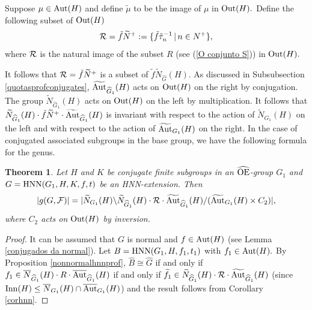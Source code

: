 \documentclass[a4paper,12pt]{article}
\newtheorem{thm}{Theorem}[section]
\newcommand{\Oe}{\rm \widehat{OE}}
\newcommand{\cR}{{\cal R}}
\def\aut {{\rm Aut}}
\def\out {{\rm Out}}
\def\inn {{\rm Inn}}
\def\hnn {{\rm HNN}}
\begin{document}
{%

Suppose $\mu\in \aut(H)$ and define $\tilde{\mu}$ to be the image of $\mu$ in $\out(H).$ Define the following subset of $\out(H)$ \begin{equation}\label{cS} \cR= \tilde{f}\widetilde{N}^+ := 
\{\tilde f \tilde \tau_{n}^{-1}\,|\, n \in N^{+}\},\end{equation} where $\cR$ is the natural image of the subset $R$ (see (\ref{O conjunto S})) in $\out(H).$

It follows that $\cR=\tilde{f}\widetilde{N}^+$ is a subset of $\tilde f \widetilde{N}_{\widehat G}(H)$. As discussed in Subsubsection \ref{quotasprofconjugates}, $\widetilde{\aut}_{\widehat G_1}(H)$ acts on $\out(H)$ on the right by conjugation.  %
The group $\widetilde{N}_{\widehat G_1}(H)$ acts on $\out(H)$ on the left by multiplication. It follows that $\widetilde{N}_{\widehat G_1}(H) \cdot \tilde{f} \widetilde{N}^+ \cdot \widetilde{\aut}_{\widehat G_1}(H)$ is invariant with respect to the action of $\widetilde{N}_{G_1}(H)$ on the left and with respect to the action of $\widetilde{\aut}_{G_1}(H)$ on the right. In the case of conjugated associated subgroups  in the base group, we have the following formula for the genus.

\begin{thm} \label{1.8 da introducao}  Let $H$ and $K$ be conjugate finite subgroups   in an $\Oe$-group $G_1$ and $G=\hnn(G_1,H,K,f,t)$ be an HNN-extension.  Then $$|g(G, \mathcal{F})| = | \widetilde{N}_{G_1}(H) \backslash \widetilde{N}_{\widehat G_1}(H) \cdot \cR  \cdot \widetilde{\aut}_{\widehat G_1}(H)/( \widetilde{\aut}_{G_1}(H) \times C_2)|,$$ where $C_2$ acts on $\out(H)$ by inversion. 
\end{thm}

\begin{proof} It can be assumed that $G$ is normal and $f \in \aut(H)$ (see Lemma \ref{conjugados da normal}). Let $B=\hnn(G_1,H,f_1,t_1)$ with $f_1 \in \aut(H).$ By Proposition \ref{nonnormalhnnprof}, $\widehat B \cong \widehat G$ if and only if $f_1  \in \overline{N}_{\widehat G_1}(H) \cdot R \cdot \overline{\aut}_{\widehat G_1}(H)$ if and only if  $\widetilde{f_1} \in \widetilde{N}_{\widehat G_1}(H) \cdot \cR \cdot \widetilde{\aut}_{\widehat G_1}(H)$ (since $\inn(H)\leq \overline{N}_{G_1}(H) \cap \overline{\aut}_{G_1}(H)$) and the result follows from Corollary \ref{corhnn}. 
\end{proof}


}
\end{document}
